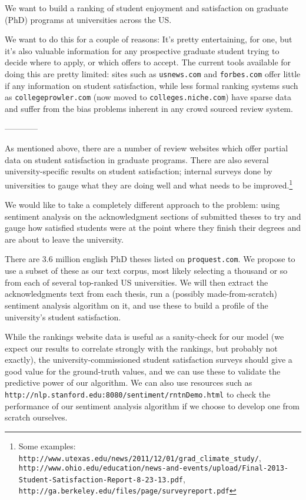 We want to build a ranking of student enjoyment and satisfaction on graduate (PhD) programs at universities across the US. 

We want to do this for a couple of reasons: It's pretty entertaining, for one, but it's also valuable information for any prospective graduate student trying to decide where to apply, or which offers to accept. The current tools available for doing this are pretty limited: sites such as {\tt usnews.com} and {\tt forbes.com} offer little if any information on student satisfaction, while less formal ranking systems such as {\tt collegeprowler.com} (now moved to {\tt colleges.niche.com}) have sparse data and suffer from the bias problems inherent in any crowd sourced review system.

------------

As mentioned above, there are a number of review websites which offer partial data on student satisfaction in graduate programs. There are also several university-specific results on student satisfaction; internal surveys done by universities to gauge what they are doing well and what needs to be improved.\footnote{Some examples: \verb|http://www.utexas.edu/news/2011/12/01/grad_climate_study/|, \\
\verb|http://www.ohio.edu/education/news-and-events/upload/Final-2013-Student-Satisfaction-Report-8-23-13.pdf|,\\
\verb|http://ga.berkeley.edu/files/page/surveyreport.pdf|}

We would like to take a completely different approach to the problem: using sentiment analysis on the acknowledgment sections of submitted theses to try and gauge how satisfied students were at the point where they finish their degrees and are about to leave the university.

There are 3.6 million english PhD theses listed on \verb|proquest.com|. We propose to use a subset of these as our text corpus, most likely selecting a thousand or so from each of several top-ranked US universities. We will then extract the acknowledgments text from each thesis, run a (possibly made-from-scratch) sentiment analysis algorithm on it, and use these to build a profile of the university's student satisfaction.

While the rankings website data is useful as a sanity-check for our model (we expect our results to correlate strongly with the rankings, but probably not exactly), the university-commissioned student satisfaction surveys should give a good value for the ground-truth values, and we can use these to validate the predictive power of our algorithm. We can also use resources such as \verb|http://nlp.stanford.edu:8080/sentiment/rntnDemo.html| to check the performance of our sentiment analysis algorithm if we choose to develop one from scratch ourselves.


